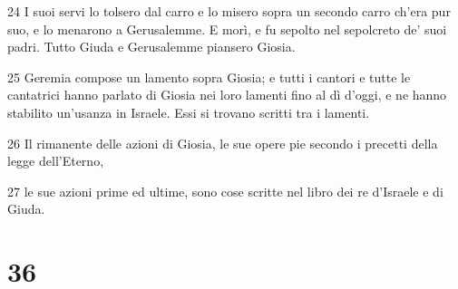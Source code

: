 \par 24 I suoi servi lo tolsero dal carro e lo misero sopra un secondo carro ch'era pur suo, e lo menarono a Gerusalemme. E morì, e fu sepolto nel sepolcreto de' suoi padri. Tutto Giuda e Gerusalemme piansero Giosia.
\par 25 Geremia compose un lamento sopra Giosia; e tutti i cantori e tutte le cantatrici hanno parlato di Giosia nei loro lamenti fino al dì d'oggi, e ne hanno stabilito un'usanza in Israele. Essi si trovano scritti tra i lamenti.
\par 26 Il rimanente delle azioni di Giosia, le sue opere pie secondo i precetti della legge dell'Eterno,
\par 27 le sue azioni prime ed ultime, sono cose scritte nel libro dei re d'Israele e di Giuda.

\chapter{36}

